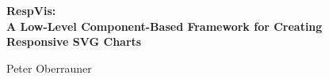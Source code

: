 %
%
% 
% 
% 




\vspace*{2cm}


\begin{center}
\begin{spacing}{1.1}
\Huge\sffamily\bfseries
RespVis:\\
A Low-Level Component-Based Framework for Creating\\
Responsive SVG Charts
\end{spacing}

\vspace{3cm}


\vspace{3cm}

{\LARGE\sffamily
Peter Oberrauner
}
\end{center}








\cleardoublepage


\vspace*{-3cm}

